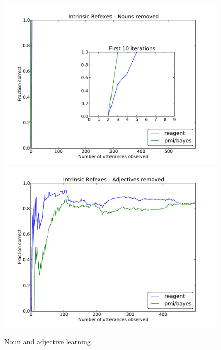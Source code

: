 \documentclass[12pt]{article}
\begin{document}
\begin{figure}
\centering
\includegraphics[scale=0.7]{grammar/1_intrinsic_refex_nouns.pdf}
\includegraphics[scale=0.7]{grammar/2_intrinsic_refex_adjectives.pdf}
\caption{Noun and adjective learning \label{fig:adjnoun}}
\end{figure}
\newpage
\end{document}
